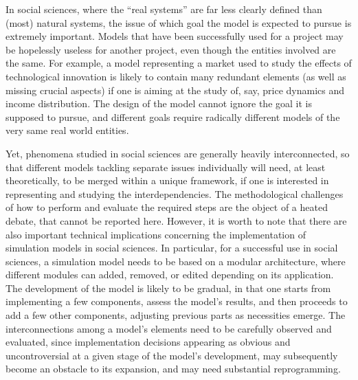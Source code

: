 \documentclass [11pt,a4paper] {book}
\begin{document}
In social sciences, where the ``real systems'' are far less clearly defined than (most) natural systems, the issue of which goal the model is expected to pursue is extremely important. Models that have been successfully used for a project may be hopelessly useless for another project, even though the entities involved are the same. For example, a model representing a market used to study the effects of technological innovation is likely to contain many redundant elements (as well as missing crucial aspects) if one is aiming at the study of, say, price dynamics and income distribution. The design of the model cannot ignore the goal it is supposed to pursue, and different goals require radically different models of the very same real world entities.

Yet, phenomena studied in social sciences are generally heavily interconnected, so that different models tackling separate issues individually will need, at least theoretically, to be merged within a unique framework, if one is interested in representing and studying the interdependencies. The methodological challenges of how to perform and evaluate the required steps are the object of a heated debate, that cannot be reported here. However, it is worth to note that there are also important technical implications concerning the implementation of simulation models in social sciences. In particular, for a successful use in social sciences, a simulation model needs to be based on a modular architecture, where different modules can added, removed, or edited depending on its application. The development of the model is likely to be gradual, in that one starts from implementing a few components, assess the model's results, and then proceeds to add a few other components, adjusting previous parts as necessities emerge. The interconnections among a model's elements need to be carefully observed and evaluated, since implementation decisions appearing as obvious and uncontroversial at a given stage of the model's development, may subsequently become an obstacle to its expansion, and may need substantial reprogramming.
\end{document}
